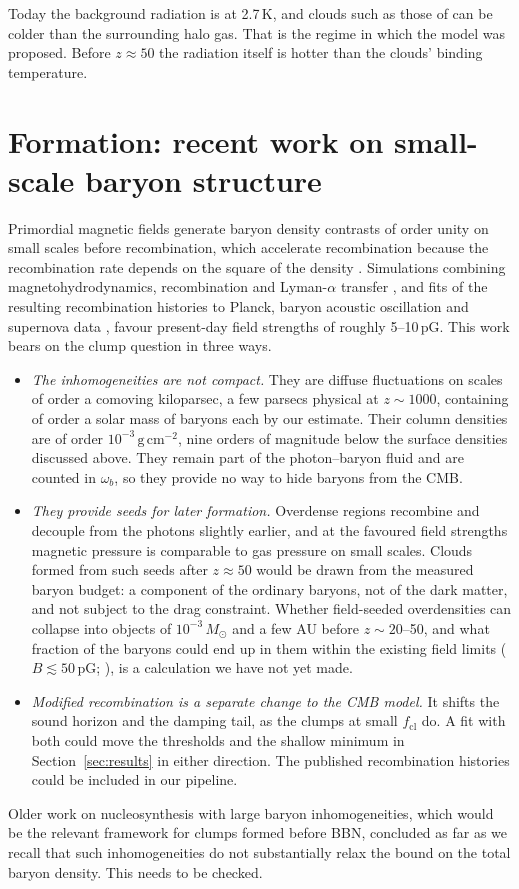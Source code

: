 \documentclass[11pt,a4paper]{article}
\newcommand{\cl}{\mathrm{cl}}
\begin{document}
Today the background radiation is at 2.7\,K, and clouds such as those of \citet{WalkerWardle1998} can be colder than the surrounding halo gas. That is the regime in which the model was proposed. Before $z \approx 50$ the radiation itself is hotter than the clouds' binding temperature.

\section{Formation: recent work on small-scale baryon structure}
\label{sec:formation}

Primordial magnetic fields generate baryon density contrasts of order unity on small scales before recombination, which accelerate recombination because the recombination rate depends on the square of the density \citep{JedamzikSaveliev2019}. Simulations combining magnetohydrodynamics, recombination and Lyman-$\alpha$ transfer \citep{Jedamzik2023}, and fits of the resulting recombination histories to Planck, baryon acoustic oscillation and supernova data \citep{Jedamzik2025}, favour present-day field strengths of roughly 5--10\,pG. This work bears on the clump question in three ways.
\begin{itemize}
\item \emph{The inhomogeneities are not compact.} They are diffuse fluctuations on scales of order a comoving kiloparsec, a few parsecs physical at $z \sim 1000$, containing of order a solar mass of baryons each by our estimate. Their column densities are of order $10^{-3}\,\mathrm{g\,cm^{-2}}$, nine orders of magnitude below the surface densities discussed above. They remain part of the photon--baryon fluid and are counted in $\omega_b$, so they provide no way to hide baryons from the CMB.
\item \emph{They provide seeds for later formation.} Overdense regions recombine and decouple from the photons slightly earlier, and at the favoured field strengths magnetic pressure is comparable to gas pressure on small scales. Clouds formed from such seeds after $z \approx 50$ would be drawn from the measured baryon budget: a component of the ordinary baryons, not of the dark matter, and not subject to the drag constraint. Whether field-seeded overdensities can collapse into objects of $10^{-3}\,M_\odot$ and a few AU before $z \sim 20$--50, and what fraction of the baryons could end up in them within the existing field limits ($B \lesssim 50$\,pG; \citealt{JedamzikSaveliev2019}), is a calculation we have not yet made.
\item \emph{Modified recombination is a separate change to the CMB model.} It shifts the sound horizon and the damping tail, as the clumps at small $f_\cl$ do. A fit with both could move the thresholds and the shallow minimum in Section~\ref{sec:results} in either direction. The published recombination histories could be included in our pipeline.
\end{itemize}
Older work on nucleosynthesis with large baryon inhomogeneities, which would be the relevant framework for clumps formed before BBN, concluded as far as we recall that such inhomogeneities do not substantially relax the bound on the total baryon density. This needs to be checked.
\end{document}
